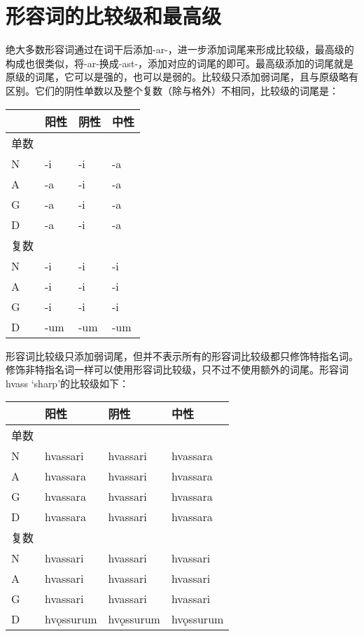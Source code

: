 \section{形容词的比较级和最高级}\label{形容词的比较级和最高级}

绝大多数形容词通过在词干后添加-ar-，进一步添加词尾来形成比较级，最高级的构成也很类似，将-ar-换成-ast-，添加对应的词尾的即可。最高级添加的词尾就是原级的词尾，它可以是强的，也可以是弱的。比较级只添加弱词尾，且与原级略有区别。它们的阴性单数以及整个复数（除与格外）不相同，比较级的词尾是：

\begin{longtable}{llll}
  \toprule
     & 阳性  & 阴性  & 中性  \\
  \midrule
  \endhead
  \bottomrule
  \endfoot
  单数 &     &     &     \\
  N  & -i  & -i  & -a  \\
  A  & -a  & -i  & -a  \\
  G  & -a  & -i  & -a  \\
  D  & -a  & -i  & -a  \\
  复数 &     &     &     \\
  N  & -i  & -i  & -i  \\
  A  & -i  & -i  & -i  \\
  G  & -i  & -i  & -i  \\
  D  & -um & -um & -um \\
\end{longtable}

形容词比较级只添加弱词尾，但并不表示所有的形容词比较级都只修饰特指名词。修饰非特指名词一样可以使用形容词比较级，只不过不使用额外的词尾。形容词hvass
`sharp‌'的比较级如下：

\begin{longtable}{llll}
  \toprule
     & 阳性        & 阴性        & 中性        \\
  \midrule
  \endhead
  \bottomrule
  \endfoot
  单数 &           &           &           \\
  N  & hvassari  & hvassari  & hvassara  \\
  A  & hvassara  & hvassari  & hvassara  \\
  G  & hvassara  & hvassari  & hvassara  \\
  D  & hvassara  & hvassari  & hvassara  \\
  复数 &           &           &           \\
  N  & hvassari  & hvassari  & hvassari  \\
  A  & hvassari  & hvassari  & hvassari  \\
  G  & hvassari  & hvassari  & hvassari  \\
  D  & hvǫssurum & hvǫssurum & hvǫssurum \\
\end{longtable}

